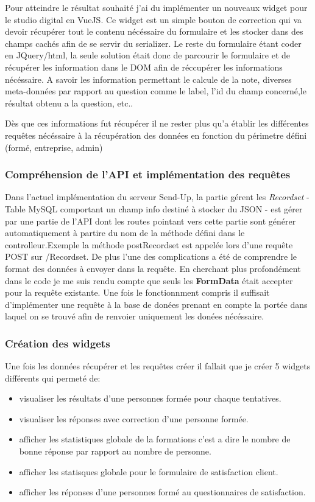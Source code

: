 Pour atteindre le résultat souhaité j'ai du implémenter un nouveaux widget pour le studio digital en VueJS. Ce widget est un simple bouton de correction qui va devoir récupérer tout le contenu nécéssaire du formulaire et les stocker dans des champs cachés afin de se servir du serializer. Le reste du formulaire étant coder en JQuery/html, la seule solution était donc de parcourir le formulaire et de récupérer les information dans le DOM afin de réccupérer les informations nécéssaire. A savoir les information permettant le calcule de la note, diverses meta-données par rapport au question comme le label, l'id du champ concerné,le résultat obtenu a la question, etc.. 

Dès que ces informations fut récupérer il ne rester plus qu'a établir les différentes requêtes nécéssaire à la récupération des données en fonction du périmetre défini (formé, entreprise, admin)


\subsubsection{Compréhension de l'API et implémentation des requêtes}

Dans l'actuel implémentation du serveur Send-Up, la partie gérent les \textit{Recordset} - Table MySQL comportant un champ info destiné à stocker du JSON - est gérer par une partie de l'API dont les routes pointant vers cette partie sont générer automatiquement à partire du nom de la méthode défini dans le controlleur.Exemple la méthode postRecordset est appelée lors d'une requête POST sur /Recordset. De plus l'une des complications a été de comprendre le format des données à envoyer dans la requête. En cherchant plus profondément dans le code je me suis rendu compte que seuls les \textbf{FormData} était accepter pour la requête existante.
Une fois le fonctionnment compris il suffisait d'implémenter une requête à la base de donées prenant en compte la portée dans laquel on se trouvé afin de renvoier uniquement les donées nécéssaire.

\subsubsection{Création des widgets}

Une fois les données récupérer et les requêtes créer il fallait que je créer 5 widgets différents qui permeté de: 
\begin{itemize}
    \item visualiser les résultats d'une personnes formée pour chaque tentatives. 
    \item  visualiser les réponses avec correction d'une personne formée.
    \item afficher les statistiques globale de la formations c'est a dire le nombre de bonne réponse par rapport au nombre de personne.
    \item afficher les statisques globale pour le formulaire de satisfaction client. 
    \item afficher les réponses d'une personnes formé au questionnaires de satisfaction.  
\end{itemize}


